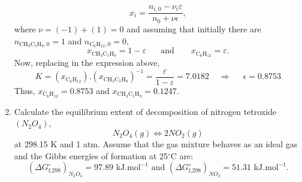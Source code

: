 \documentclass[12pts,a4paper,amsmath,amssymb,floatfix]{article}%
\newcommand{\frc}{\displaystyle\frac}
\begin{document}
\begin{enumerate}[1)]
         \begin{displaymath}
            x_{i} = \frc{n_{i,0} - \nu_{i}\varepsilon}{n_{0}+\nu\epsilon},
         \end{displaymath}
         where $\nu = (-1) + (1) = 0$ and assuming that initially there are $n_{\text{CH}_{3}\text{C}_{5}\text{H}_{9},0}=1$ and $n_{\text{C}_{6}\text{H}_{12},0}=0$,
         \begin{displaymath}
            x_{\text{CH}_{3}\text{C}_{5}\text{H}_{9}} = 1-\varepsilon\;\;\;\;\;\text{ and }\;\;\;\;\;\; x_{\text{C}_{6}\text{H}_{12}} = \varepsilon.
         \end{displaymath}
         Now, replacing in the expression above, 
         \begin{displaymath}
             K = \left(x_{\text{C}_{6}\text{H}_{12}}\right).\left(x_{\text{CH}_{3}\text{C}_{5}\text{H}_{9}}\right)^{-1} = \frc{\varepsilon}{1-\varepsilon} = 7.0182 \;\;\;\; \Longrightarrow \;\;\;\;\; \epsilon = 0.8753 
         \end{displaymath}
         Thus, $x_{\text{C}_{6}\text{H}_{12}}=0.8753$ and $x_{\text{CH}_{3}\text{C}_{5}\text{H}_{9}}=0.1247$.

\clearpage

\item\label{Example:4} Calculate the equilibrium extent of decomposition of nitrogen tetroxide $\left(N_{2}O_{4}\right)$,
  \begin{displaymath}
     N_{2}O_{4} (g) \Longleftrightarrow 2 NO_{2} (g)
  \end{displaymath}
  at 298.15 K and 1 atm. Assume that the gas mixture behaves as an ideal gas and the Gibbs energies of formation at 25$^{\circ}$C are:
  \begin{displaymath}
     \left(\Delta G^{\circ}_{\text{f,298}}\right)_{N_{2}O_{4}} = 97.89 \text{ kJ.mol}^{-1} \text{ and } \left(\Delta G^{\circ}_{\text{f,298}}\right)_{NO_{2}} = 51.31 \text{ kJ.mol}^{-1}.
  \end{displaymath}
     

\bigskip


\end{enumerate}
\end{document}
